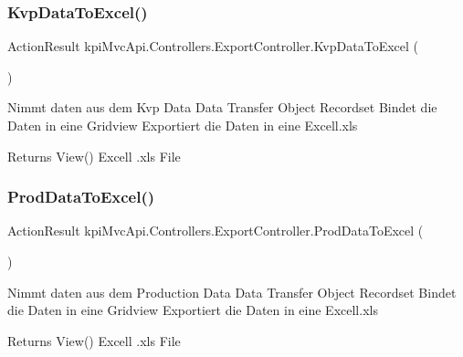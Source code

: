 \subsubsection{\texorpdfstring{Kvp\+Data\+To\+Excel()}{KvpDataToExcel()}\hspace{0.1cm}{\footnotesize\ttfamily [2/2]}}
{\footnotesize\ttfamily Action\+Result kpi\+Mvc\+Api.\+Controllers.\+Export\+Controller.\+Kvp\+Data\+To\+Excel (\begin{DoxyParamCaption}{ }\end{DoxyParamCaption})\hspace{0.3cm}{\ttfamily [inline]}}



Nimmt daten aus dem Kvp Data Data Transfer Object Recordset Bindet die Daten in eine Gridview Exportiert die Daten in eine Excell.\+xls 

\begin{DoxyReturn}{Returns}
View() Excell .xls File 
\end{DoxyReturn}
\mbox{\label{classkpi_mvc_api_1_1_controllers_1_1_export_controller_a7f779c9cca92a11fd9c37bfef15c0ad4}} 
\subsubsection{\texorpdfstring{Prod\+Data\+To\+Excel()}{ProdDataToExcel()}\hspace{0.1cm}{\footnotesize\ttfamily [1/2]}}
{\footnotesize\ttfamily Action\+Result kpi\+Mvc\+Api.\+Controllers.\+Export\+Controller.\+Prod\+Data\+To\+Excel (\begin{DoxyParamCaption}{ }\end{DoxyParamCaption})\hspace{0.3cm}{\ttfamily [inline]}}



Nimmt daten aus dem Production Data Data Transfer Object Recordset Bindet die Daten in eine Gridview Exportiert die Daten in eine Excell.\+xls 

\begin{DoxyReturn}{Returns}
View() Excell .xls File 
\end{DoxyReturn}
\mbox{\label{classkpi_mvc_api_1_1_controllers_1_1_export_controller_a7f779c9cca92a11fd9c37bfef15c0ad4}} 
